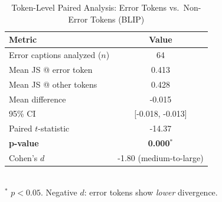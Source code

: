 
\begin{table}[!t]
\renewcommand{\arraystretch}{1.2}
\caption{Token-Level Paired Analysis: Error Tokens vs.\ Non-Error Tokens (BLIP)}
\label{tab:token_level}
\centering
\begin{tabular}{lc}
\hline
\textbf{Metric} & \textbf{Value} \\
\hline
Error captions analyzed ($n$) & 64 \\
Mean JS @ error token & 0.413 \\
Mean JS @ other tokens & 0.428 \\
Mean difference & -0.015 \\
95\% CI & [-0.018, -0.013] \\
Paired $t$-statistic & -14.37 \\
\textbf{p-value} & \textbf{0.000}$^{*}$ \\
Cohen's $d$ & -1.80 (medium-to-large) \\
\hline
\end{tabular}
\\
\small $^{*}$ $p < 0.05$. Negative $d$: error tokens show \emph{lower} divergence.
\end{table}
